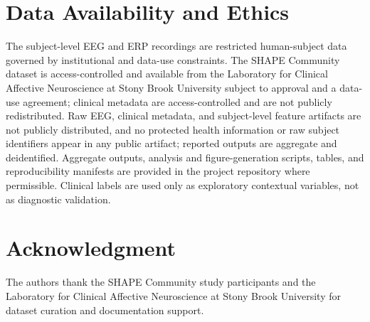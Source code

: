 \documentclass[journal]{IEEEtran}
\begin{document}
\section*{Data Availability and Ethics}
The subject-level EEG and ERP recordings are restricted human-subject data governed by institutional and data-use constraints. The SHAPE Community dataset is access-controlled and available from the Laboratory for Clinical Affective Neuroscience at Stony Brook University subject to approval and a data-use agreement; clinical metadata are access-controlled and are not publicly redistributed. Raw EEG, clinical metadata, and subject-level feature artifacts are not publicly distributed, and no protected health information or raw subject identifiers appear in any public artifact; reported outputs are aggregate and deidentified. Aggregate outputs, analysis and figure-generation scripts, tables, and reproducibility manifests are provided in the project repository where permissible. Clinical labels are used only as exploratory contextual variables, not as diagnostic validation.

\section*{Acknowledgment}
The authors thank the SHAPE Community study participants and the Laboratory for Clinical Affective Neuroscience at Stony Brook University for dataset curation and documentation support.
\end{document}
